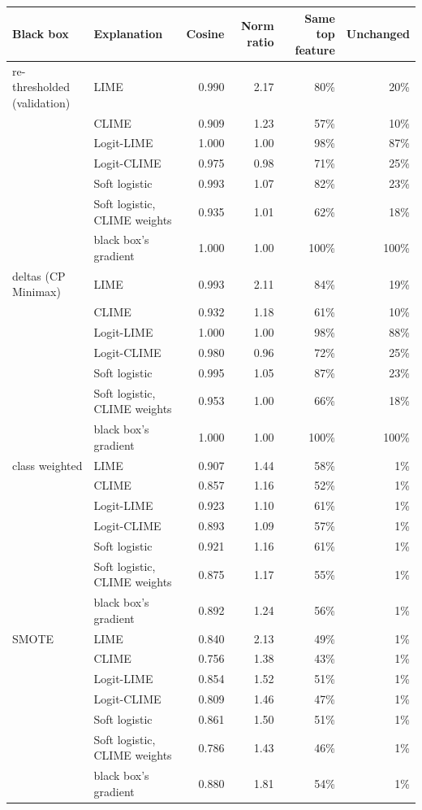 \begin{tabular}{@{}llrrrr@{}}
  \toprule
  Black box & Explanation & Cosine & Norm ratio & Same top feature & Unchanged \\
  \midrule
  re-thresholded (validation) & LIME & 0.990 & 2.17 & 80\% & 20\% \\
   & CLIME & 0.909 & 1.23 & 57\% & 10\% \\
   & Logit-LIME & 1.000 & 1.00 & 98\% & 87\% \\
   & Logit-CLIME & 0.975 & 0.98 & 71\% & 25\% \\
   & Soft logistic & 0.993 & 1.07 & 82\% & 23\% \\
   & Soft logistic, CLIME weights & 0.935 & 1.01 & 62\% & 18\% \\
   & black box's gradient & 1.000 & 1.00 & 100\% & 100\% \\
  \midrule
  deltas (CP Minimax) & LIME & 0.993 & 2.11 & 84\% & 19\% \\
   & CLIME & 0.932 & 1.18 & 61\% & 10\% \\
   & Logit-LIME & 1.000 & 1.00 & 98\% & 88\% \\
   & Logit-CLIME & 0.980 & 0.96 & 72\% & 25\% \\
   & Soft logistic & 0.995 & 1.05 & 87\% & 23\% \\
   & Soft logistic, CLIME weights & 0.953 & 1.00 & 66\% & 18\% \\
   & black box's gradient & 1.000 & 1.00 & 100\% & 100\% \\
  \midrule
  class weighted & LIME & 0.907 & 1.44 & 58\% & 1\% \\
   & CLIME & 0.857 & 1.16 & 52\% & 1\% \\
   & Logit-LIME & 0.923 & 1.10 & 61\% & 1\% \\
   & Logit-CLIME & 0.893 & 1.09 & 57\% & 1\% \\
   & Soft logistic & 0.921 & 1.16 & 61\% & 1\% \\
   & Soft logistic, CLIME weights & 0.875 & 1.17 & 55\% & 1\% \\
   & black box's gradient & 0.892 & 1.24 & 56\% & 1\% \\
  \midrule
  SMOTE & LIME & 0.840 & 2.13 & 49\% & 1\% \\
   & CLIME & 0.756 & 1.38 & 43\% & 1\% \\
   & Logit-LIME & 0.854 & 1.52 & 51\% & 1\% \\
   & Logit-CLIME & 0.809 & 1.46 & 47\% & 1\% \\
   & Soft logistic & 0.861 & 1.50 & 51\% & 1\% \\
   & Soft logistic, CLIME weights & 0.786 & 1.43 & 46\% & 1\% \\
   & black box's gradient & 0.880 & 1.81 & 54\% & 1\% \\
  \bottomrule
\end{tabular}
